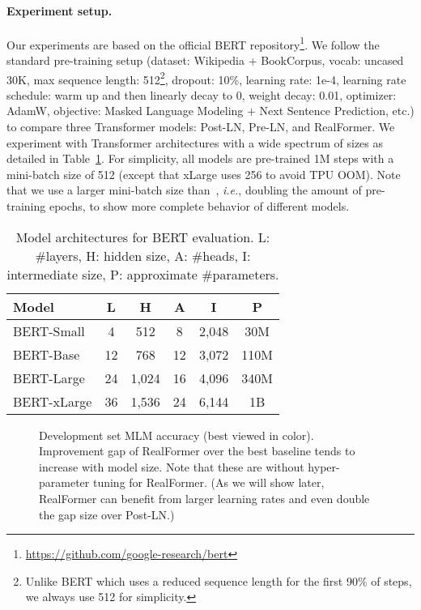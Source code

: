 \documentclass[11pt,a4paper]{article}
\begin{document}
\paragraph{Experiment setup.}
Our experiments are based on the official BERT repository\footnote{\url{https://github.com/google-research/bert}}. We follow the standard pre-training setup (dataset: Wikipedia + BookCorpus, vocab: uncased 30K, max sequence length: 512\footnote{Unlike BERT which uses a reduced sequence length for the first 90\% of steps, we always use 512 for simplicity.}, dropout: 10\%, learning rate: 1e-4, learning rate schedule: warm up and then linearly decay to 0, weight decay: 0.01, optimizer: AdamW, objective: Masked Language Modeling + Next Sentence Prediction, etc.) to compare three Transformer models: Post-LN, Pre-LN, and RealFormer. 
We experiment with Transformer architectures with a wide spectrum of sizes as detailed in Table~\ref{table:bert-arch}. For simplicity, all models are pre-trained 1M steps with a mini-batch size of 512 (except that xLarge uses 256 to avoid TPU OOM). Note that we use a larger mini-batch size than~\citet{Devlin-2019-bert}, \emph{i.e.}, doubling the amount of pre-training epochs, to show more complete behavior of different models.

\begin{table}
\setlength{\tabcolsep}{5pt}
\centering
\begin{tabular}{l|ccccc}
\hline \textbf{Model} & \textbf{L} & \textbf{H} & \textbf{A} & \textbf{I} & \textbf{P} \\ \hline
BERT-Small  & 4  & 512   & 8  & 2,048 & 30M  \\
BERT-Base   & 12 & 768   & 12 & 3,072 & 110M \\
BERT-Large  & 24 & 1,024 & 16 & 4,096 & 340M \\
BERT-xLarge & 36 & 1,536 & 24 & 6,144 & 1B \\
\hline
\end{tabular}
\caption{\label{table:bert-arch} Model architectures for BERT evaluation. L: \#layers, H: hidden size, A: \#heads, I: intermediate size, P: approximate \#parameters.}
\end{table}

\begin{figure*}
\caption{Development set MLM accuracy (best viewed in color). Improvement gap of RealFormer over the best baseline tends to increase with model size. Note that these are without hyper-parameter tuning for RealFormer. (As we will show later, RealFormer can benefit from larger learning rates and even double the gap size over Post-LN.)}
\label{fig:mlm}
\end{figure*}
\end{document}
